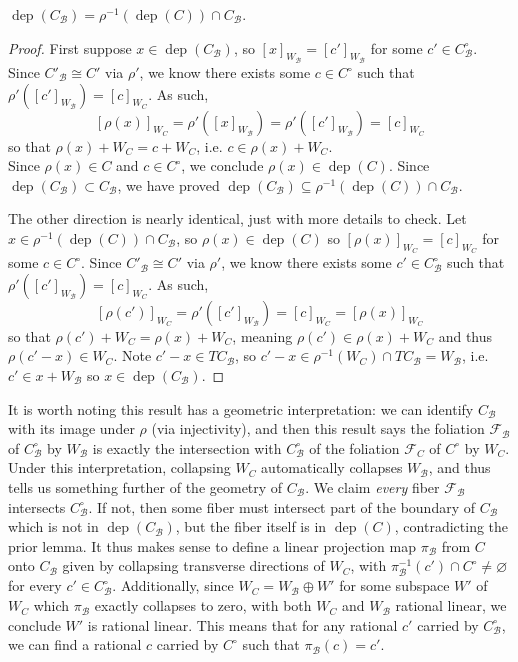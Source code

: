 \documentclass[12pt]{article}
\newcommand{\B}{\mathcal{B}}
\DeclareMathOperator{\dep}{dep}
\renewcommand{\emptyset}{\varnothing}
\renewcommand{\it}{\textit}
\theoremstyle{nonumberdefinition}
\theoremstyle{empty}
\theoremstyle{empty}
\begin{document}
\begin{lemma}
	$\dep(C_\B) = \rho^{-1}(\dep(C)) \cap C_\B$.
\end{lemma}
\begin{proof}
	First suppose $x \in \dep(C_\B)$, so $[x]_{W_\B} = [c']_{W_\B}$ for some $c' \in C_\B^\circ$. Since $C'_\B \cong C'$ via $\rho'$, we know there exists some $c \in C^\circ$ such that $\rho'([c']_{W_\B}) = [c]_{W_C}$. As such, 
	\[[\rho(x)]_{W_C} = \rho'([x]_{W_\B}) = \rho'([c']_{W_\B}) = [c]_{W_C}\]
	so that $\rho(x) + W_C = c + W_C$, i.e. $c \in \rho(x) + W_C$.\\Since $\rho(x) \in C$ and $c \in C^\circ$, we conclude $\rho(x) \in \dep(C)$. Since $\dep(C_\B) \subset C_\B$, we have proved $\dep(C_\B) \subseteq \rho^{-1}(\dep(C)) \cap C_\B$.

	The other direction is nearly identical, just with more details to check. Let $x \in \rho^{-1}(\dep(C)) \cap C_\B$, so $\rho(x) \in \dep(C)$ so $[\rho(x)]_{W_C} = [c]_{W_C}$ for some $c \in C^\circ$. Since $C'_\B \cong C'$ via $\rho'$, we know there exists some $c' \in C_\B^\circ$ such that $\rho'([c']_{W_\B}) = [c]_{W_C}$. As such,
	\[[\rho(c')]_{W_C} = \rho'([c']_{W_\B}) = [c]_{W_C} = [\rho(x)]_{W_C}\]
	so that $\rho(c') + W_C = \rho(x) + W_C$, meaning $\rho(c') \in \rho(x) + W_C$ and thus $\rho(c' - x) \in W_C$. Note $c' - x \in TC_\B$, so $c' - x \in \rho^{-1}(W_C) \cap TC_\B = W_\B$, i.e. $c' \in x + W_\B$ so $x \in \dep(C_\B)$.
\end{proof}

It is worth noting this result has a geometric interpretation: we can identify $C_\B$ with its image under $\rho$ (via injectivity), and then this result says the foliation $\mathcal F_\B$ of $C_\B^\circ$ by $W_\B$ is exactly the intersection with $C_\B^\circ$ of the foliation $\mathcal F_C$ of $C^\circ$ by $W_C$. Under this interpretation, collapsing $W_C$ automatically collapses $W_\B$, and thus  tells us something further of the geometry of $C_\B$. We claim \it{every} fiber $\mathcal F_\B$ intersects $C_\B^\circ$. If not, then some fiber must intersect part of the boundary of $C_\B$ which is not in $\dep(C_\B)$, but the fiber itself is in $\dep(C)$, contradicting the prior lemma. It thus makes sense to define a linear projection map $\pi_\B$ from $C$ onto $C_\B$ given by collapsing transverse directions of $W_C$, with $\pi_\B^{-1}(c') \cap C^\circ \neq \emptyset$ for every $c' \in C_\B^\circ$. Additionally, since $W_C = W_\B \oplus W'$ for some subspace $W'$ of $W_C$ which $\pi_\B$ exactly collapses to zero, with both $W_C$ and $W_\B$ rational linear, we conclude $W'$ is rational linear. This means that for any rational $c'$ carried by $C_\B^\circ$, we can find a rational $c$ carried by $C^\circ$ such that $\pi_\B(c) = c'$.
\end{document}
